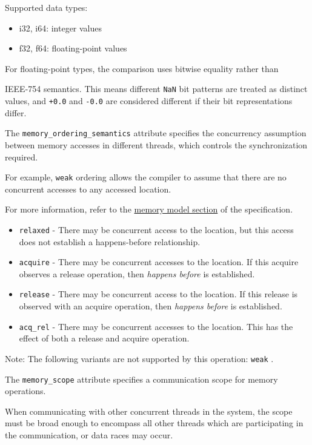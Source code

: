 \documentclass{article}
\begin{document}
Supported data types:

\begin{itemize}
\item i32, i64: integer values
\item f32, f64: floating-point values


\end{itemize}
For floating-point types, the comparison uses bitwise equality rather than

IEEE-754 semantics. This means different \texttt{NaN} bit patterns are treated as distinct values, and \texttt{+0.0} and \texttt{-0.0} are considered different if their bit representations differ.


The \texttt{memory\_ordering\_semantics} attribute specifies the concurrency assumption between memory accesses in different threads, which controls the synchronization required.

For example, \texttt{weak} ordering allows the compiler to assume that there are no concurrent accesses to any accessed location.

For more information, refer to the \href{https://docs.nvidia.com/cuda/tile-ir/latest/sections/memory_model.html#section-memory-model}{memory model section} of the specification.


\begin{itemize}
\item \texttt{relaxed} - There may be concurrent access to the location, but this access does not establish a happens-before relationship.
\item \texttt{acquire} -  There may be concurrent accesses to the location. If this acquire observes a release operation, then \textit{happens before} is established.
\item \texttt{release} - There may be concurrent access to the location. If this release is observed with an acquire operation, then \textit{happens before} is established.
\item \texttt{acq\_rel} - There may be concurrent accesses to the location. This has the effect of both a release and acquire operation.

\end{itemize}
Note: The following variants are not supported by this operation: \texttt{weak} .


The \texttt{memory\_scope} attribute specifies a communication scope for memory operations.

When communicating with other concurrent threads in the system, the scope must be broad enough to encompass all other threads which are participating in the communication, or data races may occur.
\end{document}
